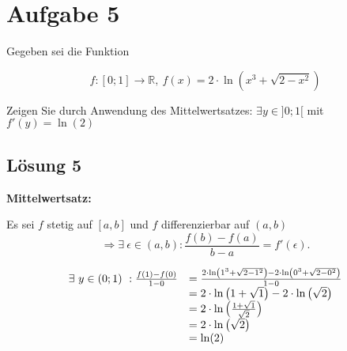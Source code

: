 \documentclass[main.tex]{subfiles}
\begin{document}
\section{Aufgabe 5}
Gegeben sei die Funktion

\begin{equation*}
    f:[0;1]\rightarrow \mathbb{R} ,\ f( x) =2\cdotp \ln\left( x^{3} +\sqrt{2-x^{2}}\right)
\end{equation*}

Zeigen Sie durch Anwendung des Mittelwertsatzes: $\exists y\in ] 0;1[$ mit $f'( y) =\ln( 2)$

\subsection{Lösung 5}

\textbf{Mittelwertsatz:}

Es sei $f$ stetig auf $[a,b]$ und $f$ differenzierbar auf $(a,b)$
\begin{equation*}
    \Rightarrow \exists \ \epsilon \in (a,b) : \frac{f(b)-f(a)}{b-a} = f'(\epsilon) \text{.}
\end{equation*}

\begin{equation*}
    \begin{array}{ r l }
    \exists \ y\in (0;1) \ :\frac{f( 1) -f( 0)}{1-0} & =\frac{2\cdotp \ln\left( 1^{3} +\sqrt{2-1^{2}}\right) -2\cdotp \ln\left( 0^{3} +\sqrt{2-0^{2}}\right)}{1-0}\\
     & =2\cdotp \ln\left( 1+\sqrt{1}\right) -2\cdotp \ln\left(\sqrt{2}\right)\\
     & =2\cdotp \ln\left(\frac{1+\sqrt{1}}{\sqrt{2}}\right)\\
     & =2\cdotp \ln\left(\sqrt{2}\right)\\
     & =\ln( 2)
    \end{array}
\end{equation*}
\end{document}
